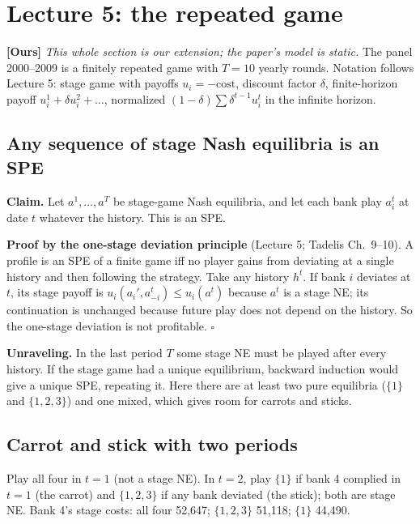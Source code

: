 \documentclass[11pt,a4paper]{article}
\newcommand{\ours}{\textbf{[Ours]}}
\begin{document}
\section{Lecture 5: the repeated game}

\ours{} \emph{This whole section is our extension; the paper's model is static.} The panel 2000--2009 is a finitely repeated game with $T=10$
yearly rounds. Notation follows Lecture 5: stage game with payoffs $u_i=-\text{cost}$, discount factor $\delta$, finite-horizon payoff
$u_i^1+\delta u_i^2+\dots$, normalized $(1-\delta)\sum\delta^{t-1}u_i^t$ in the infinite horizon.

\subsection{Any sequence of stage Nash equilibria is an SPE}
\textbf{Claim.} Let $a^1,\dots,a^T$ be stage-game Nash equilibria, and let each bank play $a_i^t$ at date $t$ whatever the history. This is an SPE.

\textbf{Proof by the one-stage deviation principle} (Lecture 5; Tadelis Ch.\ 9--10). A profile is an SPE of a finite game iff no player
gains from deviating at a single history and then following the strategy. Take any history $h^t$. If bank $i$ deviates at $t$, its stage payoff is
$u_i(a_i',a_{-i}^t)\le u_i(a^t)$ because $a^t$ is a stage NE; its continuation is unchanged because future play does not
depend on the history. So the one-stage deviation is not profitable. $\square$

\textbf{Unraveling.} In the last period $T$ some stage NE must be played after every history. If the stage game had a unique equilibrium, backward induction would give a unique SPE,
repeating it. Here there are at least two pure equilibria ($\{1\}$ and $\{1,2,3\}$) and one mixed, which gives room for carrots and sticks.

\subsection{Carrot and stick with two periods}
Play all four in $t=1$ (not a stage NE). In $t=2$, play $\{1\}$ if bank 4 complied in $t=1$ (the carrot) and $\{1,2,3\}$ if any bank deviated (the stick); both are stage
NE. Bank 4's stage costs: all four 52,647; $\{1,2,3\}$ 51,118; $\{1\}$ 44,490.
\end{document}
